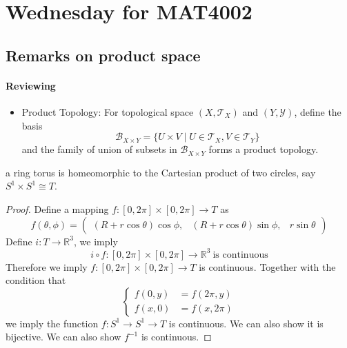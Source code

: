 \section{Wednesday for MAT4002}
\subsection{Remarks on product space} 
\paragraph{Reviewing}
\begin{itemize}
\item
Product Topology: For topological space $(X,\mathcal{T}_X)$ and $(Y,\mathcal{Y})$, define the basis
\[
\mathcal{B}_{X\times Y}=\{U\times V\mid U\in\mathcal{T}_X,V\in\mathcal{T}_Y\}
\]
and the family of union of subsets in $\mathcal{B}_{X\times Y}$ forms a product topology.
\end{itemize}
\begin{proposition}
a ring torus is homeomorphic to the Cartesian product of two circles, say $S^1\times S^1\cong T$.
\end{proposition}
 \begin{proof}
 Define a mapping $f:[0,2\pi]\times [0,2\pi]\to T$ as
 \[
 f(\theta,\phi)=\begin{pmatrix}
(R+r\cos\theta)\cos\phi,
&
(R+r\cos\theta)\sin\phi,
&
r\sin\theta
\end{pmatrix}
 \]
Define $i:T\to\mathbb{R}^3$, we imply
 \[
 i\circ f:[0,2\pi]\times[0,2\pi]\to\mathbb{R}^3\ \text{is continuous}
 \]
 Therefore we imply $f:[0,2\pi]\times [0,2\pi]\to T$ is continuous. Together with the condition that 
\[
\left\{
\begin{aligned}
f(0,y)&=f(2\pi,y)\\
f(x,0)&=f(x,2\pi)
\end{aligned}
\right.
\]
we imply the function $f:S^1\to S^1\to T$ is continuous.
We can also show it is bijective. We can also show $f^{-1}$ is continuous.
 \end{proof}
 
